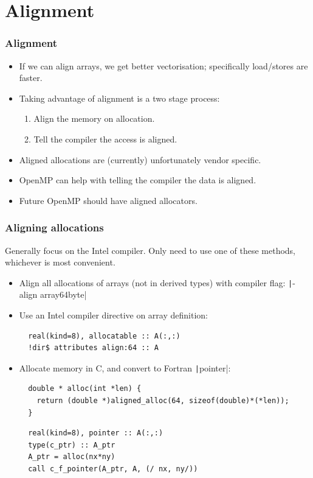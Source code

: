\documentclass{beamer}
\begin{document}
\section{Alignment}
\begin{frame}
\frametitle{Alignment}
\begin{itemize}
  \item If we can align arrays, we get better vectorisation; specifically load/stores are faster.
  \item Taking advantage of alignment is a two stage process:
    \begin{enumerate}
      \item Align the memory on allocation.
      \item Tell the compiler the access is aligned.
    \end{enumerate}
  \item Aligned allocations are (currently) unfortunately vendor specific.
  \item OpenMP can help with telling the compiler the data is aligned.
  \item Future OpenMP should have aligned allocators.
\end{itemize}
\end{frame}

\begin{frame}[fragile]
\frametitle{Aligning allocations}
Generally focus on the Intel compiler.
Only need to use one of these methods, whichever is most convenient.
\begin{itemize}
  \item Align all allocations of arrays (not in derived types) with compiler flag: \texttt|-align array64byte|
  \item Use an Intel compiler directive on array definition:
  \begin{verbatim}
  real(kind=8), allocatable :: A(:,:)
  !dir$ attributes align:64 :: A
  \end{verbatim}
  \item Allocate memory in C, and convert to Fortran \texttt|pointer|:
  \begin{verbatim}
  double * alloc(int *len) {
    return (double *)aligned_alloc(64, sizeof(double)*(*len));
  }
  \end{verbatim}
  \begin{verbatim}
  real(kind=8), pointer :: A(:,:)
  type(c_ptr) :: A_ptr
  A_ptr = alloc(nx*ny)
  call c_f_pointer(A_ptr, A, (/ nx, ny/))
  \end{verbatim}
\end{itemize}
\end{frame}
\end{document}
